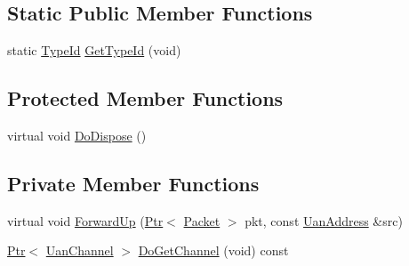 \subsection*{Static Public Member Functions}
\begin{DoxyCompactItemize}
\item 
static \hyperlink{classns3_1_1TypeId}{Type\+Id} \hyperlink{classns3_1_1UanNetDevice_a8dc58ba9c4e22e1468f987fa047e565b}{Get\+Type\+Id} (void)
\end{DoxyCompactItemize}
\subsection*{Protected Member Functions}
\begin{DoxyCompactItemize}
\item 
virtual void \hyperlink{classns3_1_1UanNetDevice_a6a794cc7b9f0194213bddba0bfb16f92}{Do\+Dispose} ()
\end{DoxyCompactItemize}
\subsection*{Private Member Functions}
\begin{DoxyCompactItemize}
\item 
virtual void \hyperlink{classns3_1_1UanNetDevice_a6bd742bff7683658efa38d726619b8c4}{Forward\+Up} (\hyperlink{classns3_1_1Ptr}{Ptr}$<$ \hyperlink{classns3_1_1Packet}{Packet} $>$ pkt, const \hyperlink{classns3_1_1UanAddress}{Uan\+Address} \&src)
\item 
\hyperlink{classns3_1_1Ptr}{Ptr}$<$ \hyperlink{classns3_1_1UanChannel}{Uan\+Channel} $>$ \hyperlink{classns3_1_1UanNetDevice_a9bd7ab08d599a1781c7a36826777f623}{Do\+Get\+Channel} (void) const 
\end{DoxyCompactItemize}
